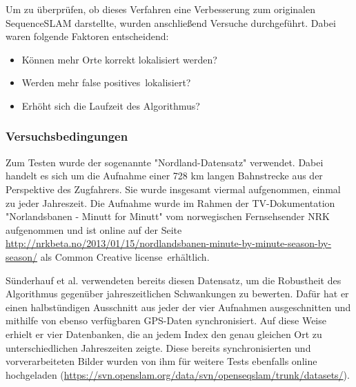 \documentclass[12pt,a4paper,titlepage]{scrartcl}
\begin{document}
Um zu überprüfen, ob dieses Verfahren eine Verbesserung zum originalen SequenceSLAM darstellte, wurden anschließend Versuche durchgeführt. Dabei waren folgende Faktoren entscheidend:
\begin{itemize}
\item Können mehr Orte korrekt lokalisiert werden?
\item Werden mehr \glqq false positives\grqq~lokalisiert?
\item Erhöht sich die Laufzeit des Algorithmus?
\end{itemize}
\subsubsection{Versuchsbedingungen}\label{kap:dyn_Versuch}
Zum Testen wurde der sogenannte "Nordland-Datensatz" verwendet. Dabei handelt es sich um die Aufnahme einer 728 km langen Bahnstrecke aus der Perspektive des Zugfahrers. Sie wurde insgesamt viermal aufgenommen, einmal zu jeder Jahreszeit. Die Aufnahme wurde im Rahmen der TV-Dokumentation "Norlandsbanen - Minutt for Minutt" vom norwegischen Fernsehsender NRK aufgenommen und ist online auf der Seite \url{http://nrkbeta.no/2013/01/15/nordlandsbanen-minute-by-minute-season-by-season/} als \glqq Common Creative license\grqq~erhältlich. 

Sünderhauf et al. verwendeten bereits diesen Datensatz, um die Robustheit des Algorithmus gegenüber jahreszeitlichen Schwankungen zu bewerten. Dafür hat er einen halbstündigen Ausschnitt aus jeder der vier Aufnahmen ausgeschnitten und mithilfe von ebenso verfügbaren GPS-Daten synchronisiert. Auf diese Weise erhielt er vier Datenbanken, die an jedem Index den genau gleichen Ort zu unterschiedlichen Jahreszeiten zeigte. Diese bereits synchronisierten und vorverarbeiteten Bilder wurden von ihm für weitere Tests ebenfalls online hochgeladen (\url{https://svn.openslam.org/data/svn/openseqslam/trunk/datasets/}).
\end{document}
